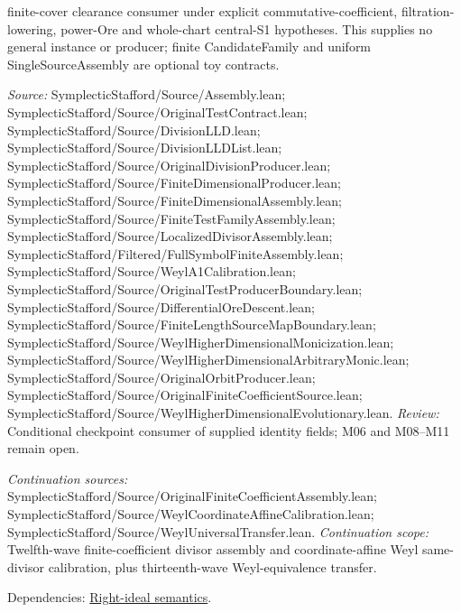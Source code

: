 finite-cover clearance consumer under explicit commutative-coefficient, filtration-lowering, power-Ore and whole-chart central-S1 hypotheses. This supplies no general instance or producer; finite CandidateFamily and uniform SingleSourceAssembly are optional toy contracts.

\emph{Source:} SymplecticStafford/Source/Assembly.lean; SymplecticStafford/Source/OriginalTestContract.lean; SymplecticStafford/Source/DivisionLLD.lean; SymplecticStafford/Source/DivisionLLDList.lean; SymplecticStafford/Source/OriginalDivisionProducer.lean; SymplecticStafford/Source/FiniteDimensionalProducer.lean; SymplecticStafford/Source/FiniteDimensionalAssembly.lean; SymplecticStafford/Source/FiniteTestFamilyAssembly.lean; SymplecticStafford/Source/LocalizedDivisorAssembly.lean; SymplecticStafford/Filtered/FullSymbolFiniteAssembly.lean; SymplecticStafford/Source/WeylA1Calibration.lean; SymplecticStafford/Source/OriginalTestProducerBoundary.lean; SymplecticStafford/Source/DifferentialOreDescent.lean; SymplecticStafford/Source/FiniteLengthSourceMapBoundary.lean; SymplecticStafford/Source/WeylHigherDimensionalMonicization.lean; SymplecticStafford/Source/WeylHigherDimensionalArbitraryMonic.lean; SymplecticStafford/Source/OriginalOrbitProducer.lean; SymplecticStafford/Source/OriginalFiniteCoefficientSource.lean; SymplecticStafford/Source/WeylHigherDimensionalEvolutionary.lean.
\emph{Review:} Conditional checkpoint consumer of supplied identity fields; M06 and M08–M11 remain open.

\emph{Continuation sources:} SymplecticStafford/Source/OriginalFiniteCoefficientAssembly.lean; SymplecticStafford/Source/WeylCoordinateAffineCalibration.lean; SymplecticStafford/Source/WeylUniversalTransfer.lean.
\emph{Continuation scope:} Twelfth-wave finite-coefficient divisor assembly and coordinate-affine Weyl same-divisor calibration, plus thirteenth-wave Weyl-equivalence transfer.

Dependencies: \hyperlink{claim:semantics}{Right-ideal semantics}.
